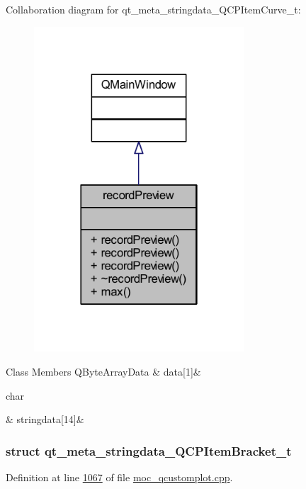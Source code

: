 Collaboration diagram for qt\+\_\+meta\+\_\+stringdata\+\_\+\+Q\+C\+P\+Item\+Curve\+\_\+t\+:
\nopagebreak
\begin{figure}[H]
\begin{center}
\leavevmode
\includegraphics[width=222pt]{d0/d61/a00302}
\end{center}
\end{figure}
\begin{DoxyFields}{Class Members}
\hypertarget{a00067_a0424f9a0b87bc8cefa2966874c4c5667}{Q\+Byte\+Array\+Data}\label{a00067_a0424f9a0b87bc8cefa2966874c4c5667}
&
data\mbox{[}1\mbox{]}&
\\
\hline

\hypertarget{a00067_af1db92bb182f435f88c938cc13a52a2c}{char}\label{a00067_af1db92bb182f435f88c938cc13a52a2c}
&
stringdata\mbox{[}14\mbox{]}&
\\
\hline

\end{DoxyFields}
\label{d7/da0/a00198}
\hypertarget{a00067_d7/da0/a00198}{}
\subsubsection{struct qt\+\_\+meta\+\_\+stringdata\+\_\+\+Q\+C\+P\+Item\+Bracket\+\_\+t}


Definition at line \hyperlink{a00067_source_l01067}{1067} of file \hyperlink{a00067_source}{moc\+\_\+qcustomplot.\+cpp}.



